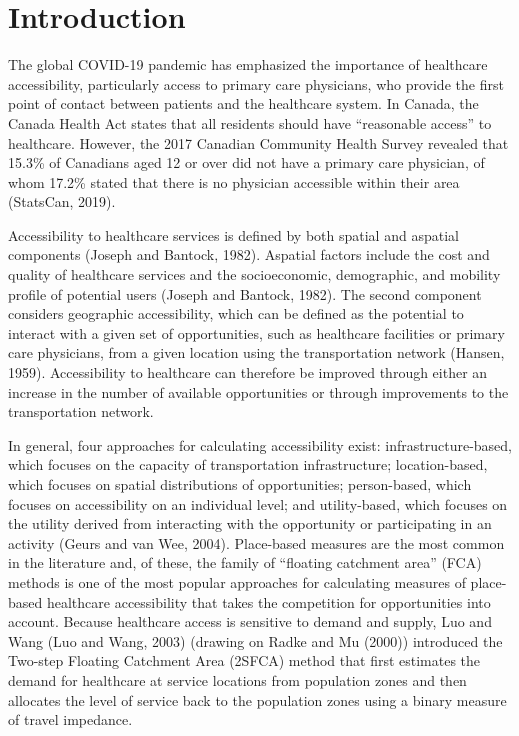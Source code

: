 \documentclass[]{elsarticle} %
\begin{document}
\hypertarget{introduction}{%
\section{Introduction}\label{introduction}}

The global COVID-19 pandemic has emphasized the importance of healthcare
accessibility, particularly access to primary care physicians, who
provide the first point of contact between patients and the healthcare
system. In Canada, the Canada Health Act states that all residents
should have ``reasonable access'' to healthcare. However, the 2017
Canadian Community Health Survey revealed that 15.3\% of Canadians aged
12 or over did not have a primary care physician, of whom 17.2\% stated
that there is no physician accessible within their area (StatsCan,
2019).

Accessibility to healthcare services is defined by both spatial and
aspatial components (Joseph and Bantock, 1982). Aspatial factors include
the cost and quality of healthcare services and the socioeconomic,
demographic, and mobility profile of potential users (Joseph and
Bantock, 1982). The second component considers geographic accessibility,
which can be defined as the potential to interact with a given set of
opportunities, such as healthcare facilities or primary care physicians,
from a given location using the transportation network (Hansen, 1959).
Accessibility to healthcare can therefore be improved through either an
increase in the number of available opportunities or through
improvements to the transportation network.

In general, four approaches for calculating accessibility exist:
infrastructure-based, which focuses on the capacity of transportation
infrastructure; location-based, which focuses on spatial distributions
of opportunities; person-based, which focuses on accessibility on an
individual level; and utility-based, which focuses on the utility
derived from interacting with the opportunity or participating in an
activity (Geurs and van Wee, 2004). Place-based measures are the most
common in the literature and, of these, the family of ``floating
catchment area'' (FCA) methods is one of the most popular approaches for
calculating measures of place-based healthcare accessibility that takes
the competition for opportunities into account. Because healthcare
access is sensitive to demand and supply, Luo and Wang (Luo and Wang,
2003) (drawing on Radke and Mu (2000)) introduced the Two-step Floating
Catchment Area (2SFCA) method that first estimates the demand for
healthcare at service locations from population zones and then allocates
the level of service back to the population zones using a binary measure
of travel impedance.
\end{document}
